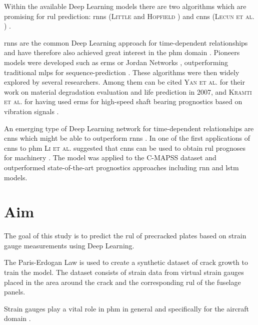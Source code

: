 \documentclass[conference]{IEEEtran}
\begin{document}
Within the available Deep Learning models there are two algorithms which are promising for \gls{rul} prediction: \glspl{rnn} (\textsc{Little} \cite{Little1996} and \textsc{Hopfield}  \cite{Hopfield1982}) and \glspl{cnn} (\textsc{Lecun et al.} \cite{Lecun1998}) \cite{Akrim2021}.

\glspl{rnn} are the common Deep Learning approach for time-dependent relationships and have therefore also achieved great interest in the \gls{phm} domain \cite{Akrim2021}. Pioneers models were developed such as \glspl{erm} \cite{Elman1990} or Jordan Networks \cite{Jordan1997}, outperforming traditional \glspl{mlp} for sequence-prediction \cite{Akrim2021}. These algorithms were then widely explored by several researchers. Among them can be cited \textsc{Yan et al.} \cite{Yan2007} for their work on material degradation evaluation and life prediction in 2007, and \textsc{Kramti et al.} \cite{Kramti2018} for having used \glspl{erm} for high-speed shaft bearing prognostics based on vibration signals \cite{Akrim2021}.

An emerging type of Deep Learning network for time-dependent relationships are \glspl{cnn} which might be able to outperform \glspl{rnn} \cite{Bai2018}. In one of the first applications of \glspl{cnn} to \gls{phm} \textsc{Li et al.} suggested that \glspl{cnn} can be used to obtain \gls{rul} prognoses for machinery \cite{Li2018}. The model was applied to the C-MAPSS dataset \cite{Saxena2008} and outperformed state-of-the-art prognostics approaches including \gls{rnn} and \gls{lstm} models.

\section{Aim}
\label{sec:aim}

The goal of this study is to predict the \gls{rul} of precracked plates based on strain gauge measurements using Deep Learning.


The Paris-Erdogan Law \cite{Paris1963} is used to create a synthetic dataset of crack growth to train the model. The dataset consists of strain data from virtual strain gauges placed in the area around the crack and the corresponding \gls{rul} of the fuselage panels.


Strain gauges play a vital role in \gls{phm} in general \cite{Tinga2019} and specifically for the aircraft domain \cite{Timothy2009}.
\end{document}
